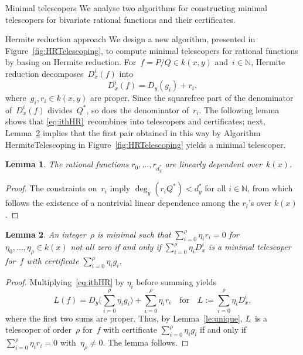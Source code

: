 \documentclass{sig-alt-full}
\newcommand{\bN}{\mathbb{N}}
\newtheorem{lemma}{Lemma}
\begin{document}
\begin{section}{Minimal telescopers}\label{sec:minimal-order}
We analyse two algorithms for constructing minimal telescopers for
bivariate rational functions and their certificates.
\begin{subsection}{Hermite reduction approach}\label{HRA}
We design a new algorithm, presented in Figure~\ref{fig:HRTelescoping},
to compute minimal telescopers for rational functions by basing on
Hermite reduction. For~$f =P/Q \in k(x, y)$ and~$i \in \bN$, Hermite reduction
decomposes~$D_x^i(f)$ into
\begin{equation}\label{eq:ithHR}
D_x^i (f) = D_y (g_i) + r_i,
\end{equation}
where~$g_i, r_i \in k(x,y)$ are proper. Since the squarefree
part of the denominator of~$D_x^i(f)$ divides~$Q^*$, so does the
denominator of~$r_i$.
The following lemma shows that \eqref{eq:ithHR}~recombines into
telescopers and certificates;
next, Lemma~\ref{le:minimaltele} implies that the first pair obtained in
this way by Algorithm \textsf{HermiteTelescoping}
in Figure~\ref{fig:HRTelescoping}
yields a minimal telescoper.

\begin{lemma}\label{le:bound}
The rational functions $r_0, \dots, r_{d_y^*}$ are linearly dependent
over~$k(x)$.
\end{lemma}

\begin{proof}
The constraints on~$r_i$ imply
$\deg_y(r_iQ^*)< d_y^*$ for all $i\in \bN$, from which
follows the existence of a nontrivial linear dependence among the
$r_i$'s over $k(x)$.
\end{proof}

\begin{lemma}\label{le:minimaltele}
An integer~$\rho$ is minimal such that $\sum_{i=0}^\rho \eta_i r_i=0$
for $\eta_0, \ldots, \eta_\rho \in k(x)$ not all zero
if and only if
$\sum_{i=0}^\rho \eta_i D_x^i$ is a minimal telescoper for~$f$ with
certificate $\sum_{i=0}^\rho \eta_i g_i$.
\end{lemma}

\begin{proof}
Multiplying~\eqref{eq:ithHR} by $\eta_i$ before summing yields
\begin{equation*}
L(f) =
  D_y\biggl(\sum_{i=0}^\rho \eta_i g_i\biggr) + \sum_{i=0}^\rho \eta_ir_i
\quad\text{for}\quad
L := \sum_{i=0}^\rho \eta_i D_x^i ,
\end{equation*}
where the first two sums are proper.
Thus, by Lemma~\ref{le:unique}, $L$~is a telescoper of order~$\rho$ for~$f$
with certificate $\sum_{i=0}^\rho \eta_i g_i$
if and only if $\sum_{i=0}^\rho \eta_i r_i=0$ with~$\eta_\rho\neq0$.
The lemma follows.
\end{proof}


\end{subsection}
\end{section}
\end{document}
